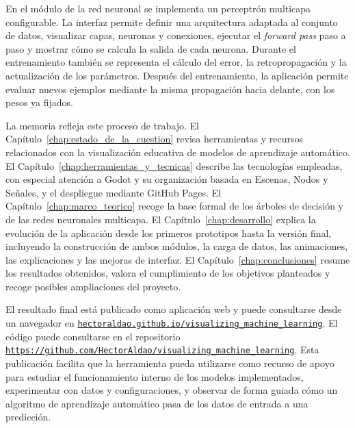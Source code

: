 En el módulo de la red neuronal se implementa un perceptrón multicapa configurable. La interfaz permite definir una arquitectura adaptada al conjunto de datos, visualizar capas, neuronas y conexiones, ejecutar el \textit{forward pass} paso a paso y mostrar cómo se calcula la salida de cada neurona. Durante el entrenamiento también se representa el cálculo del error, la retropropagación y la actualización de los parámetros. Después del entrenamiento, la aplicación permite evaluar nuevos ejemplos mediante la misma propagación hacia delante, con los pesos ya fijados.

La memoria refleja este proceso de trabajo.
El Capítulo~\ref{chap:estado_de_la_cuestion} revisa herramientas y recursos relacionados con la visualización educativa de modelos de aprendizaje automático.
El Capítulo~\ref{chap:herramientas_y_tecnicas} describe las tecnologías empleadas, con especial atención a Godot y su organización basada en \gls{Escena}s, \gls{Nodo}s y Señales, y el despliegue mediante GitHub Pages.
El Capítulo~\ref{chap:marco_teorico} recoge la base formal de los árboles de decisión y de las redes neuronales multicapa.
El Capítulo~\ref{chap:desarrollo} explica la evolución de la aplicación desde los primeros prototipos hasta la versión final, incluyendo la construcción de ambos módulos, la carga de datos, las animaciones, las explicaciones y las mejoras de interfaz.
El Capítulo~\ref{chap:conclusiones} resume los resultados obtenidos, valora el cumplimiento de los objetivos planteados y recoge posibles ampliaciones del proyecto.

El resultado final está publicado como aplicación web y puede consultarse desde un navegador en \href{https://hectoraldao.github.io/visualizing_machine_learning/}{\nolinkurl{hectoraldao.github.io/visualizing\_machine\_learning}}.
El código puede consultarse en el repositorio \href{https://github.com/HectorAldao/visualizing_machine_learning}{\nolinkurl{https://github.com/HectorAldao/visualizing\_machine\_learning}}. 
Esta publicación facilita que la herramienta pueda utilizarse como recurso de apoyo para estudiar el funcionamiento interno de los modelos implementados, experimentar con datos y configuraciones, y observar de forma guiada cómo un algoritmo de aprendizaje automático pasa de los datos de entrada a una predicción.
